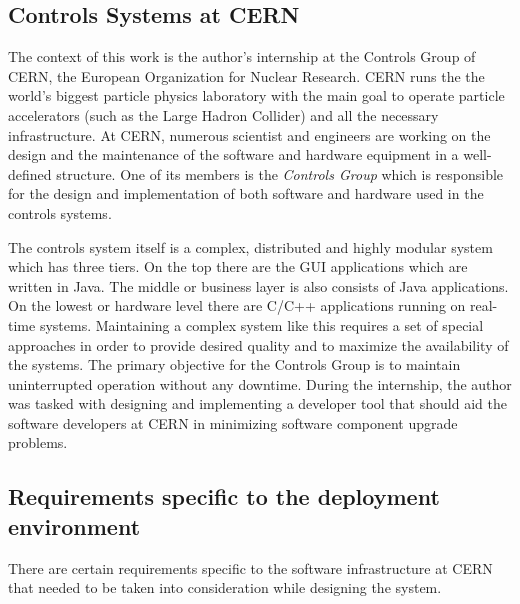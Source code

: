 \subsection{Controls Systems at CERN}
The context of this work is the author's internship at the Controls Group of
CERN, the European Organization for Nuclear Research. CERN runs the the world's
biggest particle physics laboratory with the main goal to operate particle
accelerators (such as the Large Hadron Collider) and all the necessary
infrastructure. At CERN, numerous scientist and engineers are working on the
design and the maintenance of the software and hardware equipment in a
well-defined structure. One of its members is the \emph{Controls Group} which is
responsible for the design and implementation of both software and hardware used
in the controls systems.

The controls system itself is a complex, distributed and highly modular system
which has three tiers. On the top there are the GUI applications which are
written in Java. The middle or business layer is also consists of Java
applications. On the lowest or hardware level there are C/C++ applications
running on real-time systems. Maintaining a complex system like this requires a
set of special approaches in order to provide desired quality and to maximize
the availability of the systems. The primary objective for the Controls Group is
to maintain uninterrupted operation without any downtime. During the internship,
the author was tasked with designing and implementing a developer tool that
should aid the software developers at CERN in minimizing software component
upgrade problems.

\subsection{Requirements specific to the deployment environment}
There are certain requirements specific to the software infrastructure at CERN
that needed to be taken into consideration while designing the system.

